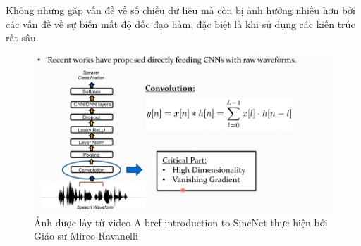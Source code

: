\documentclass{article}
\begin{document}
	Không những gặp vấn đề về số chiều dữ liệu mà còn bị ảnh hưởng nhiều hơn bởi các vấn đề về sự biến mất độ dốc đạo hàm, đặc biệt là khi sử dụng các kiến trúc rất sâu.
	\begin{figure}[H]
		\centering
		\includegraphics[width=1\textwidth]{images/cnns_problems.png}
		\caption{Ảnh được lấy từ video A bref introduction to SincNet thực hiện bởi Giáo sư Mirco Ravanelli}
		\label{fig:writing-thesis}
	\end{figure}
	
\end{document}
